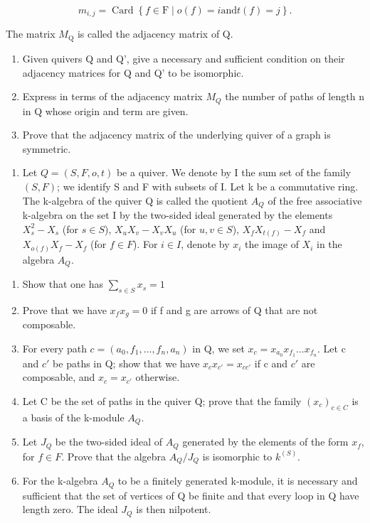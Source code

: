 \[
 m _ {i, j} = \operatorname{Card} \left\{f \in \mathrm{F} \mid o (f) = i \text {and} t (f) = j \right\}.
\]

The matrix \(M_{\mathrm{Q}}\) is called the adjacency matrix of Q.

\begin{enumerate}
\def\labelenumi{\alph{enumi})}
\item
  Given quivers Q and Q', give a necessary and sufficient condition on their adjacency matrices for Q and Q' to be isomorphic.
\item
  Express in terms of the adjacency matrix \(M_{Q}\) the number of paths of length n in Q whose origin and term are given.
\item
  Prove that the adjacency matrix of the underlying quiver of a graph is symmetric.
\end{enumerate}

\begin{enumerate}
\def\labelenumi{\arabic{enumi})}
\setcounter{enumi}{3}
\tightlist
\item
  Let \(Q = (S, F, o, t)\) be a quiver. We denote by I the sum set of the family \((S, F)\); we identify S and F with subsets of I. Let k be a commutative ring. The k-algebra of the quiver Q is called the quotient \(A_{Q}\) of the free associative k-algebra on the set I by the two-sided ideal generated by the elements \(X_{s}^{2} - X_{s}\) (for \(s \in S\)), \(X_{u}X_{v} - X_{v}X_{u}\) (for \(u, v \in S\)), \(X_{f}X_{t(f)} - X_{f}\) and \(X_{o(f)}X_{f} - X_{f}\) (for \(f \in F\)). For \(i \in I\), denote by \(x_{i}\) the image of \(X_{i}\) in the algebra \(A_{Q}\).
\end{enumerate}

\begin{enumerate}
\def\labelenumi{\alph{enumi})}
\item
  Show that one has \(\sum_{s\in S}x_s = 1\)
\item
  Prove that we have \(x_{f}x_{g}=0\) if f and g are arrows of Q that are not composable.
\item
  For every path \(c = (a_{0}, f_{1}, \ldots, f_{n}, a_{n})\) in Q, we set \(x_{c} = x_{a_{0}} x_{f_{1}} \ldots x_{f_{n}}\). Let c and \(c'\) be paths in Q; show that we have \(x_{c} x_{c'} = x_{cc'}\) if c and \(c'\) are composable, and \(x_{c} = x_{c'}\) otherwise.
\item
  Let C be the set of paths in the quiver Q; prove that the family \((x_{c})_{c\in C}\) is a basis of the k-module \(A_{Q}\).
\item
  Let \(J_{Q}\) be the two-sided ideal of \(A_{Q}\) generated by the elements of the form \(x_{f}\), for \(f \in F\). Prove that the algebra \(A_{Q}/J_{Q}\) is isomorphic to \(k^{(S)}\).
\item
  For the k-algebra \(A_{Q}\) to be a finitely generated k-module, it is necessary and sufficient that the set of vertices of Q be finite and that every loop in Q have length zero. The ideal \(J_{Q}\) is then nilpotent.
\end{enumerate}

